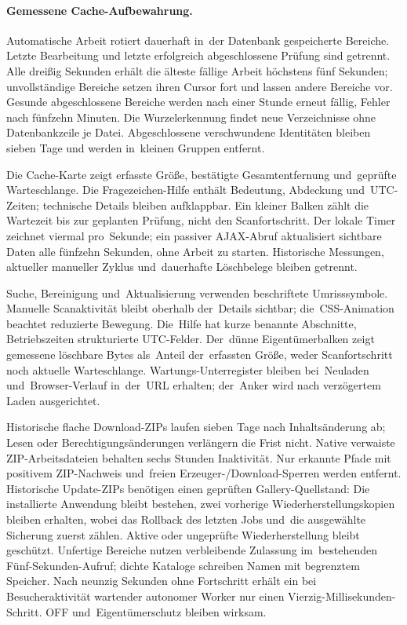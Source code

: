 \documentclass[11pt,a4paper]{article}
\begin{document}
\paragraph{Gemessene Cache-Aufbewahrung.}
Automatische Arbeit rotiert dauerhaft in~der Datenbank gespeicherte Bereiche.
Letzte Bearbeitung und letzte erfolgreich abgeschlossene Prüfung sind getrennt.
Alle dreißig Sekunden erhält die älteste fällige Arbeit höchstens fünf Sekunden;
unvollständige Bereiche setzen ihren Cursor fort und lassen andere Bereiche vor.
Gesunde abgeschlossene Bereiche werden nach einer Stunde erneut fällig, Fehler
nach fünfzehn Minuten. Die Wurzelerkennung findet neue Verzeichnisse ohne
Datenbankzeile je Datei. Abgeschlossene verschwundene Identitäten bleiben sieben
Tage und werden in~kleinen Gruppen entfernt.

Die Cache-Karte zeigt erfasste Größe, bestätigte Gesamtentfernung und~geprüfte
Warteschlange. Die Fragezeichen-Hilfe enthält Bedeutung, Abdeckung
und~UTC-Zeiten; technische Details bleiben aufklappbar. Ein kleiner Balken zählt
die Wartezeit bis zur geplanten Prüfung, nicht den Scanfortschritt. Der lokale
Timer zeichnet viermal pro~Sekunde; ein passiver AJAX-Abruf aktualisiert
sichtbare Daten alle fünfzehn Sekunden, ohne Arbeit zu starten. Historische
Messungen, aktueller manueller Zyklus und~dauerhafte Löschbelege bleiben
getrennt.

Suche, Bereinigung und~Aktualisierung verwenden beschriftete Umrisssymbole.
Manuelle Scanaktivität bleibt oberhalb der~Details sichtbar; die~CSS-Animation
beachtet reduzierte Bewegung. Die~Hilfe hat kurze benannte Abschnitte,
Betriebszeiten strukturierte UTC-Felder. Der~dünne Eigentümerbalken zeigt
gemessene löschbare Bytes als~Anteil der~erfassten Größe, weder Scanfortschritt
noch aktuelle Warteschlange. Wartungs-Unterregister bleiben bei~Neuladen
und~Browser-Verlauf in~der~URL erhalten; der~Anker wird nach verzögertem Laden
ausgerichtet.

Historische flache Download-ZIPs laufen sieben Tage nach Inhaltsänderung ab;
Lesen oder Berechtigungsänderungen verlängern die Frist nicht. Native verwaiste
ZIP-Arbeitsdateien behalten sechs Stunden Inaktivität. Nur erkannte Pfade mit
positivem ZIP-Nachweis und~freien Erzeuger-/Download-Sperren werden entfernt.
Historische Update-ZIPs benötigen einen geprüften Gallery-Quellstand: Die
installierte Anwendung bleibt bestehen, zwei vorherige Wiederherstellungskopien
bleiben erhalten, wobei das Rollback des letzten Jobs und~die ausgewählte
Sicherung zuerst zählen. Aktive oder ungeprüfte Wiederherstellung bleibt
geschützt. Unfertige Bereiche nutzen verbleibende Zulassung im~bestehenden
Fünf-Sekunden-Aufruf; dichte Kataloge schreiben Namen mit begrenztem Speicher.
Nach neunzig Sekunden ohne Fortschritt erhält ein bei Besucheraktivität
wartender autonomer Worker nur einen Vierzig-Millisekunden-Schritt. OFF
und~Eigentümerschutz bleiben wirksam.
\end{document}
